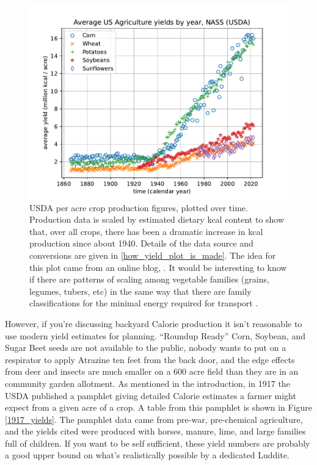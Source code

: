 \documentclass[prb,preprint]{revtex4-2}
\begin{document}
\begin{figure}[ht!]
\centering
\includegraphics[width=\columnwidth]{kcal_per_acre_yields.pdf}
\caption{
USDA per acre crop production figures, plotted over time.  Production data is scaled by estimated dietary kcal content to show that, over all crops, there has been a dramatic increase in kcal production since about 1940.  
Details of the data source and conversions are given in \ref{how_yield_plot_is_made}.
The idea for this plot came from an online blog, \cite{math_encounters}.  
It would be interesting to know if there are patterns of scaling among vegetable families (grains, legumes, tubers, etc) in the same way that there are family classifications for the minimal energy required for transport \cite{energetic_cost_of_moving}.
}
\label{ag_yields}
\end{figure}

However, if you're discussing backyard Calorie production it isn't reasonable to use modern yield estimates for planning.  ``Roundup Ready'' Corn, Soybean, and Sugar Beet seeds are not available to the public, nobody wants to put on a respirator to apply Atrazine ten feet from the back door,  and the edge effects from deer and insects are much smaller on a $600$ acre field than they are in an community garden allotment.  As mentioned in the introduction, in 1917 the USDA published a pamphlet \cite{USDA_1917_yields_pamphlet} giving detailed Calorie estimates a farmer might expect from a given acre of a crop.  A table from this pamphlet is shown in Figure \ref{1917_yields}.  
The pamphlet data came from pre-war, pre-chemical agriculture, and the yields cited were produced with horses, manure, lime, and large families full of children.  If you want to be self sufficient, these yield numbers are probably a good upper bound on what's realistically possible by a dedicated Luddite.  
\end{document}
